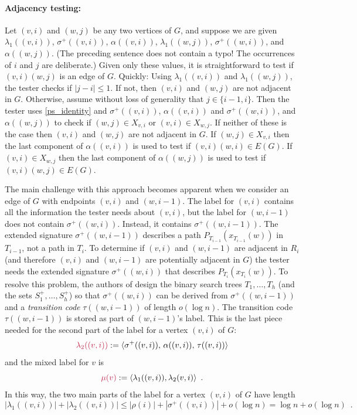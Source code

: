 \documentclass{patmorin}
\makeatletter
\let\eqref\cref
\renewcommand{\le}{\leqslant}
\newcommand{\defin}[1]{\emph{\textcolor{brightmaroon}{#1}}}
\def\mathcolor#1#{\@mathcolor{#1}}
\def\@mathcolor#1#2#3{%
  \protect\leavevmode
  \begingroup
    \color#1{#2}#3%
  \endgroup
}
\newcommand{\mathdefin}[1]{\mathcolor{brightmaroon}{#1}}
\makeatother
\begin{document}
  \paragraph{Adjacency testing:}
  Let $(v,i)$ and $(w,j)$ be any two vertices of $G$, and suppose we are given $\lambda_1((v,i))$, $\sigma^+((v,i))$, $\alpha((v,i))$, $\lambda_1((w,j))$, $\sigma^+((w,i))$, and $\alpha((w,j))$.
  (The preceding sentence does not contain a typo! The occurrences of $i$ and $j$ are deliberate.) Given only these values, it is straightforward to test if $(v,i)(w,j)$ is an edge of $G$.
  Quickly: Using $\lambda_1((v,i))$ and $\lambda_1((w,j))$, the tester checks if $|j-i|\le 1$.
  If not, then $(v,i)$ and $(w,j)$ are not adjacent in $G$.  Otherwise, assume without loss of generality that $j\in\{i-1, i\}$.
  Then the tester uses \eqref{ps_identity} and $\sigma^+((v,i))$, $\alpha((v,i))$ and $\sigma^+((w,i))$, and $\alpha((w,j))$ to check if $(w,j)\in X_{v,i}$ or $(v,i)\in X_{w,j}$.
  If neither of these is the case then $(v,i)$ and $(w,j)$ are not adjacent in $G$.
  If $(w,j)\in X_{v,i}$ then the last component of $\alpha((v,i))$ is used to test if $(v,i)(w,i)\in E(G)$.
  If $(v,i)\in X_{w,j}$ then the last component of $\alpha((w,j))$ is used to test if $(v,i)(w,j)\in E(G)$.

  The main challenge with this approach becomes apparent when we consider an edge of $G$ with endpoints $(v,i)$ and $(w,i-1)$.
  The label for $(v,i)$ contains all the information the tester needs about $(v,i)$, but the label for $(w,i-1)$ does not contain $\sigma^+((w,i))$.
  Instead, it contains $\sigma^+((w,i-1))$.  The extended signature $\sigma^+((w,i-1))$ describes a path $P_{T_{i-1}}(x_{T_{i-1}}(w))$ in $T_{i-1}$, not a path in $T_i$.  To determine if $(v,i)$ and $(w,i-1)$ are adjacent in $R_i$ (and therefore $(v,i)$ and $(w,i-1)$ are potentially adjacent in $G$) the tester needs the extended signature $\sigma^+((w,i))$ that describes $P_{T_i}(x_{T_i}(w))$.  To resolve this problem, the authors of \cite{dujmovic.esperet.ea:adjacency} design the binary search trees $T_1,\ldots,T_h$ (and the sets $S^+_1,\ldots,S^+_h$) so that $\sigma^+((w,i))$ can be derived from $\sigma^+((w,i-1))$ and a \defin{transition code} \defin{$\tau((w,i-1))$} of length $o(\log n)$. The transition code $\tau((w,i-1))$ is stored as part of $(w,i-1)$'s label.
  This is the last piece needed for the second part of the label for a vertex $(v,i)$ of $G$:
  \[
    \mathdefin{\lambda_2((v,i))} := \langle \sigma^+((v,i)),\, \alpha((v,i)),\, \tau((v,i)) \rangle 
  \]
  and the mixed label for $v$ is 
  \[
    \mathdefin{\mu(v)} := \langle \lambda_1((v,i)), \lambda_2(v,i)\rangle \enspace .
  \]
  In this way, the two main parts of the label for a vertex $(v,i)$ of $G$ have length
  \[
      |\lambda_1((v,i))|+|\lambda_2((v,i))| \le |\rho(i)| + |\sigma^+((v,i))| + o(\log n) = \log n + o(\log n) \enspace .
  \]
\end{document}
